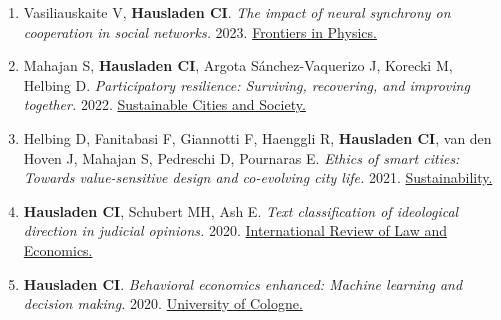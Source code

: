 \documentclass[11pt]{article}
\begin{document}
\begin{enumerate}[parsep=0pt]
\item Vasiliauskaite V, \textbf{Hausladen CI}. {\em The impact of neural synchrony on cooperation in social networks.} 2023.  
\href{https://www.frontiersin.org/articles/10.3389/fphy.2023.1125270/full}{Frontiers in Physics.}  

\item Mahajan S, \textbf{Hausladen CI}, Argota Sánchez-Vaquerizo J, Korecki M, Helbing D. {\em Participatory resilience: Surviving, recovering, and improving together.} 2022.  
\href{https://doi.org/10.1016/j.scs.2022.103942}{Sustainable Cities and Society.}  

\item Helbing D, Fanitabasi F, Giannotti F, Haenggli R, \textbf{Hausladen CI}, van den Hoven J, Mahajan S, Pedreschi D, Pournaras E. {\em Ethics of smart cities: Towards value-sensitive design and co-evolving city life.} 2021.  
\href{https://doi.org/10.3390/su132011162}{Sustainability.} 

\item \textbf{Hausladen CI}, Schubert MH, Ash E. {\em Text classification of ideological direction in judicial opinions.} 2020.  
\href{https://doi.org/10.1016/j.irle.2020.105903}{International Review of Law and Economics.}  

\item \textbf{Hausladen CI}. {\em Behavioral economics enhanced: Machine learning and decision making.} 2020.  
\href{https://kups.ub.uni-koeln.de/12231/}{University of Cologne.}  

\end{enumerate}
\end{document}
